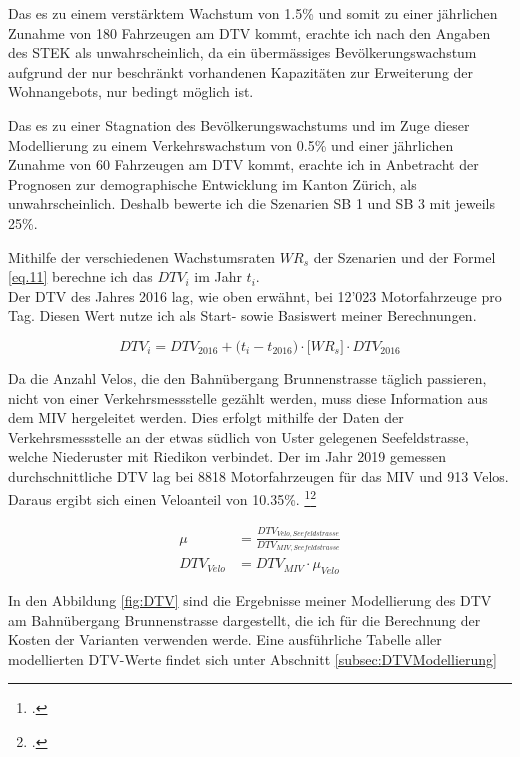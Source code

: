 Das es zu einem verstärktem Wachstum von 1.5\% und somit zu einer jährlichen Zunahme von 180 Fahrzeugen am DTV kommt, erachte ich nach den Angaben des STEK als unwahrscheinlich, da ein übermässiges Bevölkerungswachstum aufgrund der nur beschränkt vorhandenen Kapazitäten zur Erweiterung der Wohnangebots, nur bedingt möglich ist. 

Das es zu einer Stagnation des Bevölkerungswachstums und im Zuge dieser Modellierung zu einem Verkehrswachstum von 0.5\% und einer jährlichen Zunahme von 60 Fahrzeugen am DTV kommt, erachte ich in Anbetracht der Prognosen zur demographische Entwicklung im Kanton Zürich, als unwahrscheinlich. Deshalb bewerte ich die Szenarien SB 1 und SB 3 mit jeweils 25\%.

Mithilfe der verschiedenen Wachstumsraten $WR_{s}$ der Szenarien und der Formel \ref{eq.11} berechne ich das $DTV_{i}$ im Jahr $t_{i}$. \\
Der DTV des Jahres 2016 lag, wie oben erwähnt, bei 12'023 Motorfahrzeuge pro Tag. Diesen Wert nutze ich als Start- sowie Basiswert meiner Berechnungen. 

\begin{equation}
DTV_{i} = DTV_{2016} + \bigl( t_{i} - t_{2016} \bigr) \cdot \bigl[WR_{s}\bigr] \cdot DTV_{2016}
\label{eq.11}
\end{equation}

Da die Anzahl Velos, die den Bahnübergang Brunnenstrasse täglich passieren, nicht von einer Verkehrsmessstelle gezählt werden, muss diese Information aus dem MIV hergeleitet werden. Dies erfolgt mithilfe der Daten der Verkehrsmessstelle an der etwas südlich von Uster gelegenen Seefeldstrasse, welche Niederuster mit Riedikon verbindet. 
Der im Jahr 2019 gemessen durchschnittliche DTV lag bei 8818 Motorfahrzeugen für das MIV und 913 Velos. Daraus ergibt sich einen Veloanteil von 10.35\%. \footcite{MIVSeefeld}\footcite{VeloSeefeld}

\begin{align*}
\mu &= \frac{DTV_{Velo,Seefeldstrasse}}{DTV_{MIV,Seefeldstrasse}}   \\[2ex]
DTV_{Velo} &= DTV_{MIV} \cdot \mu_{Velo} 
\end{align*}

In den Abbildung \ref{fig:DTV} sind die Ergebnisse meiner Modellierung des DTV am Bahnübergang Brunnenstrasse dargestellt, die ich für die Berechnung der Kosten der Varianten verwenden werde. Eine ausführliche Tabelle aller modellierten DTV-Werte findet sich unter Abschnitt \ref{subsec:DTVModellierung}


